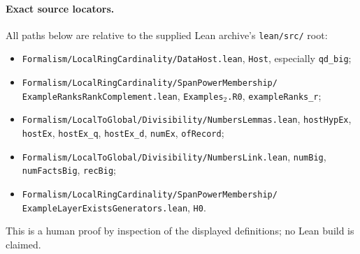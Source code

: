 \paragraph{Exact source locators.}
All paths below are relative to the supplied Lean archive's
\texttt{lean/src/} root:
\begin{itemize}
\item \texttt{Formalism/LocalRingCardinality/DataHost.lean},
      \texttt{Host}, especially \texttt{qd\_big};
\item \texttt{Formalism/LocalRingCardinality/SpanPowerMembership/
      ExampleRanksRankComplement.lean}, \texttt{Examples$_2$.R0},
      \texttt{exampleRanks\_r};
\item \texttt{Formalism/LocalToGlobal/Divisibility/NumbersLemmas.lean},
      \texttt{hostHypEx}, \texttt{hostEx}, \texttt{hostEx\_q},
      \texttt{hostEx\_d}, \texttt{numEx}, \texttt{ofRecord};
\item \texttt{Formalism/LocalToGlobal/Divisibility/NumbersLink.lean},
      \texttt{numBig}, \texttt{numFactsBig}, \texttt{recBig};
\item \texttt{Formalism/LocalRingCardinality/SpanPowerMembership/
      ExampleLayerExistsGenerators.lean}, \texttt{H0}.
\end{itemize}
This is a human proof by inspection of the displayed definitions;
no Lean build is claimed.
